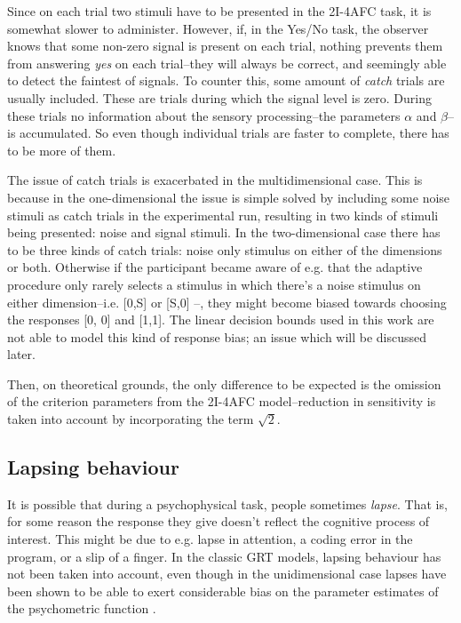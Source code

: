 \documentclass{article}\usepackage{knitr}
\begin{document}
Since on each trial two stimuli have to be presented in the 2I-4AFC task, it is somewhat slower to administer. However, if, in the Yes/No task, the observer knows that some non-zero signal is present on each trial, nothing prevents them from answering \textit{yes} on each trial--they will always be correct, and seemingly able to detect the faintest of signals. To counter this, some amount of \textit{catch} trials are usually included. These are trials during which the signal level is zero. During these trials no information about the sensory processing--the parameters $\alpha$ and $\beta$--is accumulated. So even though individual trials are faster to complete, there has to be more of them. 

The issue of catch trials is exacerbated in the multidimensional case. This is because in the one-dimensional the issue is simple solved by including some noise stimuli as catch trials in the experimental run, resulting in two kinds of stimuli being presented: noise and signal stimuli. In the two-dimensional case there has to be three kinds of catch trials: noise only stimulus on either of the dimensions or both. Otherwise if the participant became aware of e.g. that the adaptive procedure only rarely selects a stimulus in which there's a noise stimulus on either dimension--i.e. [0,S] or [S,0] --, they might become biased towards choosing the responses [0, 0] and [1,1]. The linear decision bounds used in this work are not able to model this kind of response bias; an issue which will be discussed later. 

Then, on theoretical grounds, the only difference to be expected is the omission of the criterion parameters from the 2I-4AFC model--reduction in sensitivity is taken into account by incorporating the term $\sqrt{2}$. 

\subsection{Lapsing behaviour}
\label{sec:lapses_general}

It is possible that during a psychophysical task, people sometimes \textit{lapse}. That is, for some reason the response they give doesn't reflect the cognitive process of interest. This might be due to e.g. lapse in attention, a coding error in the program, or a slip of a finger. In the classic GRT models, lapsing behaviour has not been taken into account, even though in the unidimensional case lapses have been shown to be able to exert considerable bias on the parameter estimates of the psychometric function \citep{wichmannhill2001}. 
\end{document}

